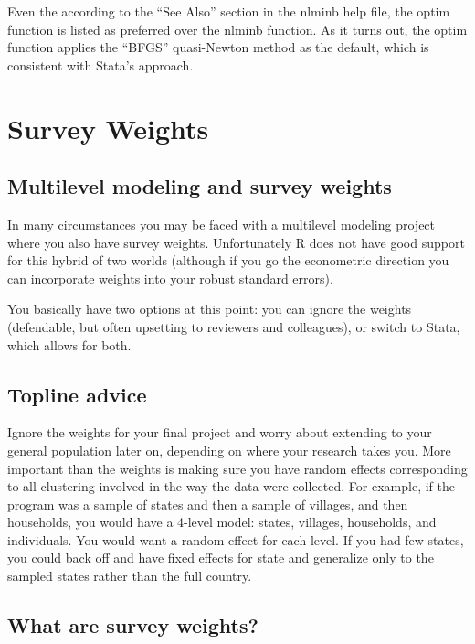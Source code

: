 \documentclass[
  letterpaper,
  DIV=11,
  numbers=noendperiod]{scrreprt}
\begin{document}
Even the according to the ``See Also'' section in the nlminb help file,
the optim function is listed as preferred over the nlminb function. As
it turns out, the optim function applies the ``BFGS'' quasi-Newton
method as the default, which is consistent with Stata's approach.

\hypertarget{survey-weights}{%
\chapter{Survey Weights}\label{survey-weights}}

\hypertarget{multilevel-modeling-and-survey-weights}{%
\section{Multilevel modeling and survey
weights}\label{multilevel-modeling-and-survey-weights}}

In many circumstances you may be faced with a multilevel modeling
project where you also have survey weights. Unfortunately R does not
have good support for this hybrid of two worlds (although if you go the
econometric direction you can incorporate weights into your robust
standard errors).

You basically have two options at this point: you can ignore the weights
(defendable, but often upsetting to reviewers and colleagues), or switch
to Stata, which allows for both.

\hypertarget{topline-advice}{%
\section{Topline advice}\label{topline-advice}}

Ignore the weights for your final project and worry about extending to
your general population later on, depending on where your research takes
you. More important than the weights is making sure you have random
effects corresponding to all clustering involved in the way the data
were collected. For example, if the program was a sample of states and
then a sample of villages, and then households, you would have a 4-level
model: states, villages, households, and individuals. You would want a
random effect for each level. If you had few states, you could back off
and have fixed effects for state and generalize only to the sampled
states rather than the full country.

\hypertarget{what-are-survey-weights}{%
\section{What are survey weights?}\label{what-are-survey-weights}}
\end{document}
